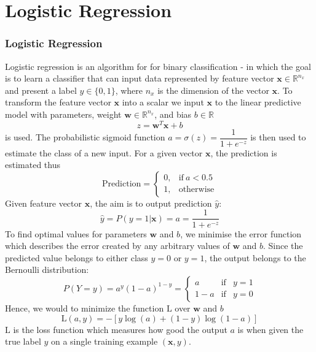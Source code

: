 \documentclass{beamer}
\begin{document}
\section{Logistic Regression}
\begin{frame}[allowframebreaks]
\frametitle{Logistic Regression}
Logistic regression is an algorithm for for binary classification - in which the goal is to learn a classifier that can input data  represented by feature vector $\bm{x} \in \mathbb{R}^{n_x}$ and present a label $y \in \{0,1\}$, where $n_x$ is the dimension of the vector $\bm{x}$. To transform the feature vector $\bm{x}$ into a scalar we input $\bm{x}$ to the linear predictive model with parameters, weight $\bm{w}\in \mathbb{R}^{n_x}$, and bias $b\in\mathbb{R}$
\begin{equation}\label{eqn:linear}
z = \bm{w}^T\bm{x} + b
\end{equation}
is used. The probabilistic sigmoid function $a=\sigma(z)=\dfrac{1}{1+e^{-z}}$  is then used to estimate the class of a new input. For a given vector $\bm{x}$, the prediction is estimated thus
\begin{equation} \label{eq:inference}
\text{Prediction} = \left\{
	\begin{array}{ll}
	0, & \text{if}\  a < 0.5 \\
    1, & \text{otherwise}
	\end{array} \right.
\end{equation}
Given feature vector $\bm{x}$, the aim is to output prediction $\hat{y}$:
\begin{equation}\label{eqn:t}
\hat{y} = P(y=1|\bm{x}) = a = \frac{1}{1+e^{-z}}
\end{equation}
To find optimal values for parameters $\bm{w}$ and $b$, we minimise the error function  which describes the error created by any arbitrary values of $\bm{w}$ and $b$. Since the predicted value belongs to either class $y=0$ or $y=1$, the output belongs to the Bernoulli distribution:
\begin{equation}\label{eqn:joint}
P(Y=y) = a^y(1-a)^{1-y}=\left\{\begin{array}{lcc}
						a & \text{if} & y=1 \\
						1-a & \text{if} & y=0
						\end{array}\right.
\end{equation}
Hence, we would to minimize the function $\mathrm{L}$ over $\bm{w}$ and $b$ 
\begin{equation}\label{eqn:loss}
\mathrm{L}(a,y) = -[y\log(a) + (1-y)\log(1-a)]
\end{equation}
$\mathrm{L}$ is the loss function which measures how good the output $a$ is when given the true label $y$ on a single training example $(\bm{x},y)$. 


\end{frame}
\end{document}
